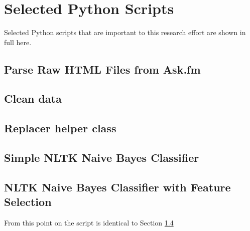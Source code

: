 
\chapter{Selected Python Scripts} %

\label{AppendixA} %


Selected Python scripts that are important to this research effort are shown in full here.

\section{Parse Raw HTML Files from Ask.fm}
\label{app:parse_raw_data}




\section{Clean data}
\label{app:baseline}




\section{Replacer helper class}
\label{app:replacer}




\section{Simple NLTK Naive Bayes Classifier}
\label{app:simple_nltk}




\section{NLTK Naive Bayes Classifier with Feature Selection}
\label{app:nltk_feature_selection}



From this point on the script is identical to Section \ref{app:simple_nltk}

